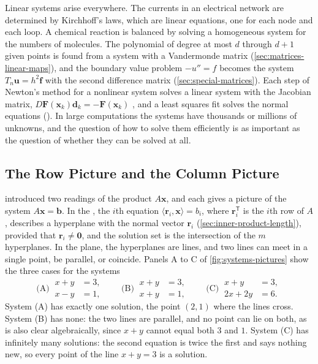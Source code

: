 Linear systems arise everywhere. The currents in an electrical network are determined by Kirchhoff's laws, which are linear equations, one for each node and each loop. A chemical reaction is balanced by solving a homogeneous system for the numbers of molecules. The polynomial of degree at most $d$ through $d+1$ given points is found from a system with a Vandermonde matrix (\cref{sec:matrices-linear-maps}), and the boundary value problem $-u''=f$ becomes the system $T_n\mathbf u=h^2\mathbf f$ with the second difference matrix (\cref{sec:special-matrices}). Each step of Newton's method for a nonlinear system solves a linear system with the Jacobian matrix, $D\mathbf F(\mathbf x_k)\mathbf d_k=-\mathbf F(\mathbf x_k)$ , and a least squares fit solves the normal equations (). In large computations the systems have thousands or millions of unknowns, and the question of how to solve them efficiently is as important as the question of whether they can be solved at all.

\subsection{The Row Picture and the Column Picture}

 introduced two readings of the product $A\mathbf x$, and each gives a picture of the system $A\mathbf x=\mathbf b$. In the , the $i$th equation $\langle\mathbf r_i,\mathbf x\rangle=b_i$, where $\mathbf r_i^{\mathsf T}$ is the $i$th row of $A$, describes a hyperplane with the normal vector $\mathbf r_i$ (\cref{sec:inner-product-length}), provided that $\mathbf r_i\ne\mathbf 0$, and the solution set is the intersection of the $m$ hyperplanes. In the plane, the hyperplanes are lines, and two lines can meet in a single point, be parallel, or coincide. Panels A to C of \cref{fig:systems-pictures} show the three cases for the systems
\begin{equation}
\text{(A)}\ \begin{aligned}x+y&=3,\\x-y&=1,\end{aligned}\qquad
\text{(B)}\ \begin{aligned}x+y&=3,\\x+y&=1,\end{aligned}\qquad
\text{(C)}\ \begin{aligned}x+y&=3,\\2x+2y&=6.\end{aligned}
\label{eq:three-cases}
\end{equation}
System (A) has exactly one solution, the point $(2,1)$ where the lines cross. System (B) has none: the two lines are parallel, and no point can lie on both, as is also clear algebraically, since $x+y$ cannot equal both $3$ and $1$. System (C) has infinitely many solutions: the second equation is twice the first and says nothing new, so every point of the line $x+y=3$ is a solution.

